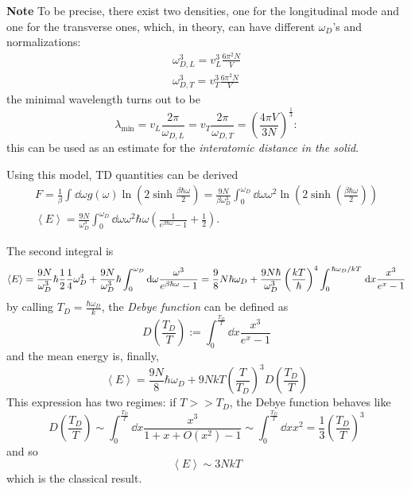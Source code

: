 \textbf{Note} To be precise, there exist two densities, one for the longitudinal
mode and one for the transverse ones, which, in theory, can have different
$\omega_D$'s and normalizations:
\begin{gather*}
    \omega_{D,L}^3 = v_L^3\frac{6\pi^2N}{V}\\
    \omega_{D,T}^3 = v_T^3\frac{6\pi^2N}{V}
\end{gather*}
the minimal wavelength turns out to be
\[
    \lambda_\text{min} = v_L\frac{2\pi}{\omega_{D,L}}=
    v_T\frac{2\pi}{\omega_{D,T}} = \left(\frac{4\pi V}{3N}\right)^{\frac{1}{3}}:
\]
this can be used as an estimate for the \textit{interatomic distance in the
solid}.

Using this model, TD quantities can be derived
\begin{gather*}
    F = \frac{1}{\beta}\int_{}^{} \dd\omega g(\omega)
    \ln\left(2\sinh\frac{\beta\hbar\omega}{2}\right) = 
    \frac{9N}{\beta\omega_D^3}\int_{0}^{\omega_D} \dd\omega \omega^2\ln
    \left(2\sinh\left(\frac{\beta\hbar\omega}{2}\right)\right)\\
    \left\langle E\right\rangle  =
    \frac{9N}{\omega_D^3}\int_{0}^{\omega_D} \dd\omega \omega^2\hbar\omega
    \left(\frac{1}{e^{\beta\hbar\omega}-1}+\frac{1}{2}\right).
\end{gather*}

The second integral is
\begin{gather*}
    \left\langle E\right\rangle = \frac{9N}{\omega^3_D}\hbar \frac{1}{2}
    \frac{1}{4}\omega_D^4+\frac{9N}{\omega_D^3}\hbar\int_{0}^{\omega_D} \dd\omega
    \frac{\omega^3}{e^{\beta\hbar\omega}-1}=\frac{9}{8}N\hbar\omega_D+
    \frac{9N\hbar}{\omega_D^3}\left(\frac{kT}{\hbar}\right)^4
    \int_{0}^{\flatfrac{\hbar \omega_D}{kT}} \dd x \frac{x^3}{e^x-1}
\end{gather*}
by calling $T_D = \frac{\hbar\omega_D}{k}$, the \textit{Debye function}
can be defined as
\[
    D\left(\frac{T_D}{T}\right):=\int_{0}^{\frac{T_D}{T}} \dd x \frac{x^3}{e^x-1}
\]
and the mean energy is, finally,
\[
    \left\langle E\right\rangle = \frac{9N}{8}\hbar\omega_D + 9NkT\left(\frac{T}
    {T_D}\right)^3 D\left(\frac{T_D}{T}\right)
\]
This expression has two regimes: if $T>>T_D$, the Debye function behaves like
\[
    D\left(\frac{T_D}{T}\right) \sim\int_{0}^{\frac{T_D}{T}} \dd x \frac{x^3}{
    1+x+O(x^2)-1} \sim \int^{\frac{T_D}{T}}_{0} \dd x x^2 =
    \frac{1}{3}\left(\frac{T_D}{T}\right)^3
\]
and so
\[
    \left\langle E\right\rangle \sim 3NkT
\]
which is the classical result.

